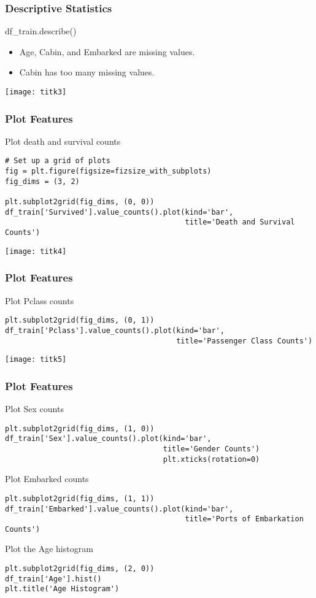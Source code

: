\begin{frame}[fragile]\frametitle{Descriptive Statistics}
df\_train.describe()
\begin{itemize}
\item Age, Cabin, and Embarked are missing values. 
\item Cabin has too many missing values.
\end{itemize}
\begin{center}
\texttt{[image: titk3]}
\end{center}
\end{frame}

\begin{frame}[fragile]\frametitle{Plot Features}
Plot death and survival counts
\begin{lstlisting}
# Set up a grid of plots
fig = plt.figure(figsize=fizsize_with_subplots) 
fig_dims = (3, 2)

plt.subplot2grid(fig_dims, (0, 0))
df_train['Survived'].value_counts().plot(kind='bar', 
                                         title='Death and Survival Counts')
\end{lstlisting}
\begin{center}
\texttt{[image: titk4]}
\end{center}
\end{frame}

\begin{frame}[fragile]\frametitle{Plot Features}
Plot Pclass counts
\begin{lstlisting}
plt.subplot2grid(fig_dims, (0, 1))
df_train['Pclass'].value_counts().plot(kind='bar', 
                                       title='Passenger Class Counts')
\end{lstlisting}
\begin{center}
\texttt{[image: titk5]}
\end{center}
\end{frame}

\begin{frame}[fragile]\frametitle{Plot Features}
Plot Sex counts
\begin{lstlisting}
plt.subplot2grid(fig_dims, (1, 0))
df_train['Sex'].value_counts().plot(kind='bar', 
                                    title='Gender Counts')
                                    plt.xticks(rotation=0)
\end{lstlisting}
Plot Embarked counts
\begin{lstlisting}
plt.subplot2grid(fig_dims, (1, 1))
df_train['Embarked'].value_counts().plot(kind='bar', 
                                         title='Ports of Embarkation Counts')
\end{lstlisting}
Plot the Age histogram
\begin{lstlisting}
plt.subplot2grid(fig_dims, (2, 0))
df_train['Age'].hist()
plt.title('Age Histogram')
\end{lstlisting}
\end{frame}

